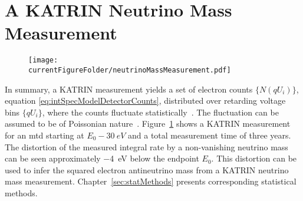 \section{A KATRIN Neutrino Mass Measurement}
\label{sec:intSpecModelNuMassMeasurement}
\begin{figure}
	\centering
	\texttt{[image: \\currentFigureFolder/neutrinoMassMeasurement.pdf]}
	\label{fig:katrinExpNuMassMeasurement}
\end{figure}
In summary, a KATRIN measurement yields a set of electron counts $\{N(qU_i)\}$, equation \eqref{eq:intSpecModelDetectorCounts}, distributed over retarding voltage bins $\{qU_i\}$, where the counts fluctuate statistically~\cite{Angrik:2005ep}. The fluctuation can be assumed to be of Poissonian nature~\cite{Kleesiek2014}. Figure~\ref{fig:katrinExpNuMassMeasurement} shows a KATRIN measurement for an \gls{mtd} starting at $E_0-\SI{30}{eV}$ and a total measurement time of three years. The distortion of the measured integral rate by a non-vanishing neutrino mass can be seen approximately \SI{-4}{eV} below the endpoint $E_0$. This distortion can be used to infer the squared electron antineutrino mass from a KATRIN neutrino mass measurement. Chapter~\ref{sec:statMethods} presents corresponding statistical methods.